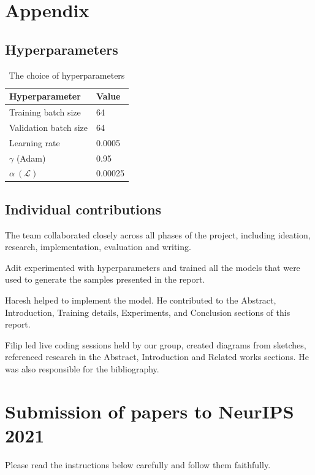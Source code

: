 \documentclass{article}
\begin{document}


\section*{Appendix}
\renewcommand{\thesubsection}{\Alph{subsection}}
\subsection{Hyperparameters}
\begin{table}[H]
  \caption{The choice of hyperparameters}
  \label{sample-table}
  \centering
  \begin{tabular}{ll}
    \toprule
    Hyperparameter     & Value\\
    \midrule
    Training batch size & 64\\
    Validation batch size & 64\\
    Learning rate & 0.0005\\
    $\gamma$ (Adam) & 0.95\\
    $\alpha\ (\mathcal{L})$ & 0.00025\\
    \bottomrule
  \end{tabular}
  \label{tab:hyperparams}
\end{table}
\subsection{Individual contributions}
The team collaborated closely across all phases of the project, including ideation, research, implementation, evaluation and writing. 

Adit experimented with hyperparameters and trained all the models that were used to generate the samples presented in the report.

Haresh helped to implement the model. He contributed to the Abstract, Introduction, Training details, Experiments, and Conclusion sections of this report.

Filip led live coding sessions held by our group, created diagrams from sketches, referenced research in the Abstract, Introduction and Related works sections. He was also responsible for the bibliography.



\newpage
\section{Submission of papers to NeurIPS 2021}

Please read the instructions below carefully and follow them faithfully.
\end{document}
